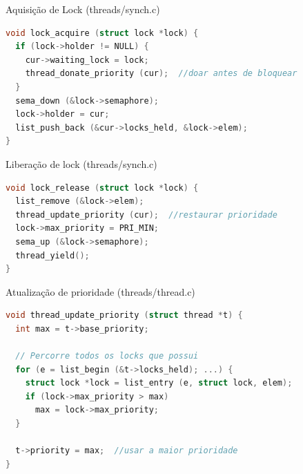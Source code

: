 \documentclass{article}
\begin{document}
\hfill \break

Aquisição de Lock (threads/synch.c)


\begin{lstlisting}[language=C]
void lock_acquire (struct lock *lock) {
  if (lock->holder != NULL) {
    cur->waiting_lock = lock;
    thread_donate_priority (cur);  //doar antes de bloquear
  }
  sema_down (&lock->semaphore);
  lock->holder = cur;
  list_push_back (&cur->locks_held, &lock->elem);
}
\end{lstlisting}

\hfill \break

Liberação de lock (threads/synch.c)

\begin{lstlisting}[language=C]
void lock_release (struct lock *lock) {
  list_remove (&lock->elem);
  thread_update_priority (cur);  //restaurar prioridade
  lock->max_priority = PRI_MIN;
  sema_up (&lock->semaphore);
  thread_yield();
}
\end{lstlisting}

\hfill \break

Atualização de prioridade (threads/thread.c)
\begin{lstlisting}[language=C]
void thread_update_priority (struct thread *t) {
  int max = t->base_priority;

  // Percorre todos os locks que possui
  for (e = list_begin (&t->locks_held); ...) {
    struct lock *lock = list_entry (e, struct lock, elem);
    if (lock->max_priority > max)
      max = lock->max_priority;
  }

  t->priority = max;  //usar a maior prioridade
}
\end{lstlisting}
\end{document}
